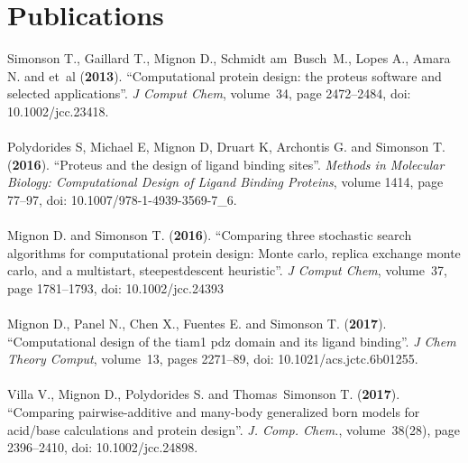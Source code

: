 \chapter*{Publications}
\noindent Simonson T., Gaillard T., Mignon D., Schmidt am~Busch~M., Lopes A., Amara N. and
  et~al (\textbf{2013}).
\newblock \enquote{Computational protein design: the proteus software and
  selected applications}.
\newblock \emph{J Comput Chem}, volume~34, page 2472–2484, doi: 10.1002/jcc.23418.\\ \\
Polydorides S, Michael E, Mignon D, Druart K, Archontis G. and Simonson T.
  (\textbf{2016}).
\newblock \enquote{Proteus and the design of ligand binding sites}.
\newblock \emph{Methods in Molecular Biology: Computational Design of Ligand
  Binding Proteins}, volume 1414, page 77–97, doi: 10.1007/978-1-4939-3569-7\_6.\\ \\
Mignon D. and Simonson T. (\textbf{2016}).
\newblock \enquote{Comparing three stochastic search algorithms for
  computational protein design: Monte carlo, replica exchange monte carlo, and
  a multistart, steepestdescent heuristic}.
\newblock \emph{J Comput Chem}, volume~37, page 1781–1793, doi: 10.1002/jcc.24393\\ \\
Mignon D., Panel N., Chen X., Fuentes E. and Simonson T. (\textbf{2017}).
\newblock \enquote{Computational design of the tiam1 pdz domain and its ligand
  binding}.
\newblock \emph{J Chem Theory Comput}, volume~13, pages 2271--89, doi: 10.1021/acs.jctc.6b01255.\\ \\
Villa V., Mignon D., Polydorides S. and Thomas~Simonson T. (\textbf{2017}).
\newblock \enquote{Comparing pairwise-additive and many-body generalized born
  models for acid/base calculations and protein design}.
\newblock \emph{J. Comp. Chem.}, volume~38(28), page 2396–2410, doi: 10.1002/jcc.24898. 








